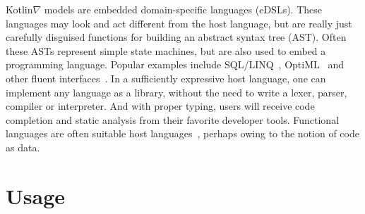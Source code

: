 \documentclass[12pt,initial,twoside,maitrise]{dms}
\numberwithin{equation}{section}
\numberwithin{table}{chapter}
\numberwithin{figure}{chapter}
\begin{document}
Kotlin$\nabla$ models are embedded domain-specific languages (eDSLs). These languages may look and act different from the host language, but are really just carefully disguised functions for building an abstract syntax tree (AST). Often these ASTs represent simple state machines, but are also used to embed a programming language. Popular examples include SQL/LINQ~\citep{meijer2006linq}, OptiML~\citep{sujeeth2011optiml} and other fluent interfaces~\citep{fowler05fluent}. In a sufficiently expressive host language, one can implement any language as a library, without the need to write a lexer, parser, compiler or interpreter. And with proper typing, users will receive code completion and static analysis from their favorite developer tools. Functional languages are often suitable host languages~\citep{elliott2003compiling,rompf2010lightweight}, perhaps owing to the notion of code as data.

\section{Usage}
\end{document}
